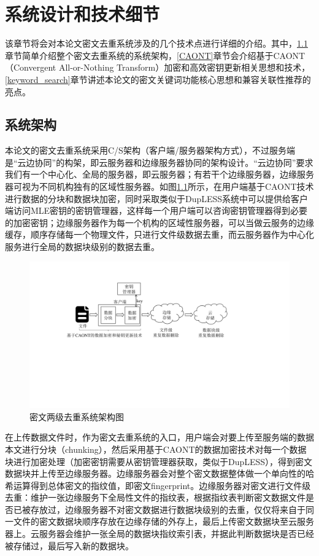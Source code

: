 \documentclass[promaster]{thesis-uestc}
\begin{document}
\chapter{系统设计和技术细节}\label{系统设计和技术细节}
该章节将会对本论文密文去重系统涉及的几个技术点进行详细的介绍。其中，\ref{系统架构}章节简单介绍整个密文去重系统的系统架构，\ref{CAONT}章节会介绍基于CAONT（Convergent All-or-Nothing Transform）加密和高效密钥更新相关思想和技术，\ref{keyword_search}章节讲述本论文的密文关键词功能核心思想和兼容关联性推荐的亮点。

\section{系统架构}\label{系统架构}
本论文的密文去重系统采用C/S架构（客户端/服务器架构方式），不过服务端是“云边协同”的构架，即云服务器和边缘服务器协同的架构设计。“云边协同”要求我们有一个中心化、全局的服务器，即云服务器；有若干个边缘服务器，边缘服务器可视为不同机构独有的区域性服务器。如图\ref{密文两级去重系统架构图}所示，在用户端基于CAONT技术进行数据的分块和数据块加密，同时采取类似于DupLESS系统中可以提供给客户端访问MLE密钥的密钥管理器，这样每一个用户端可以咨询密钥管理器得到必要的加密密钥；边缘服务器作为每一个机构的区域性服务器，可以当做云服务的边缘缓存，顺序存储每一个物理文件，只进行文件级数据去重，而云服务器作为中心化服务进行全局的数据块级别的数据去重。

\begin{figure}[htbp] %
    \centering
    \includegraphics[width = 1.0\linewidth]{pic/jiagoutu.pdf}
    \caption{密文两级去重系统架构图}
    \label{密文两级去重系统架构图}
\end{figure}

在上传数据文件时，作为密文去重系统的入口，用户端会对要上传至服务端的数据本文进行分块（chunking），然后采用基于CAONT的数据加密技术对每一个数据块进行加密处理（加密密钥需要从密钥管理器获取，类似于DupLESS），得到密文数据块并上传至边缘服务器。边缘服务器会对整个密文数据整体做一个单向性的哈希运算得到总体密文的指纹值，即密文fingerprint。边缘服务器对密文进行文件级去重：维护一张边缘服务下全局性文件的指纹表，根据指纹表判断密文数据文件是否已被存放过，边缘服务器不对密文数据进行数据块级别的去重，仅仅将来自于同一文件的密文数据块顺序存放在边缘存储的外存上，最后上传密文数据块至云服务器上。云服务器会维护一张全局的数据块指纹索引表，并据此判断数据块是否已经被存储过，最后写入新的数据块。
\end{document}
